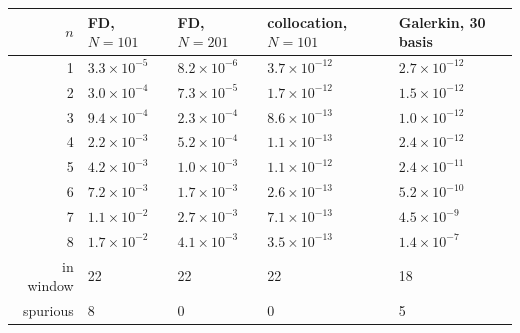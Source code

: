 \begin{tabular}{rllll}
\toprule
$n$ & FD, $N=101$ & FD, $N=201$ & collocation, $N=101$ & Galerkin, 30 basis\\
\midrule
1 & $3.3\times10^{-5}$ & $8.2\times10^{-6}$ & $3.7\times10^{-12}$ & $2.7\times10^{-12}$\\
2 & $3.0\times10^{-4}$ & $7.3\times10^{-5}$ & $1.7\times10^{-12}$ & $1.5\times10^{-12}$\\
3 & $9.4\times10^{-4}$ & $2.3\times10^{-4}$ & $8.6\times10^{-13}$ & $1.0\times10^{-12}$\\
4 & $2.2\times10^{-3}$ & $5.2\times10^{-4}$ & $1.1\times10^{-13}$ & $2.4\times10^{-12}$\\
5 & $4.2\times10^{-3}$ & $1.0\times10^{-3}$ & $1.1\times10^{-12}$ & $2.4\times10^{-11}$\\
6 & $7.2\times10^{-3}$ & $1.7\times10^{-3}$ & $2.6\times10^{-13}$ & $5.2\times10^{-10}$\\
7 & $1.1\times10^{-2}$ & $2.7\times10^{-3}$ & $7.1\times10^{-13}$ & $4.5\times10^{-9}$\\
8 & $1.7\times10^{-2}$ & $4.1\times10^{-3}$ & $3.5\times10^{-13}$ & $1.4\times10^{-7}$\\
\midrule
in window & 22 & 22 & 22 & 18\\
spurious & 8 & 0 & 0 & 5\\
\bottomrule
\end{tabular}
